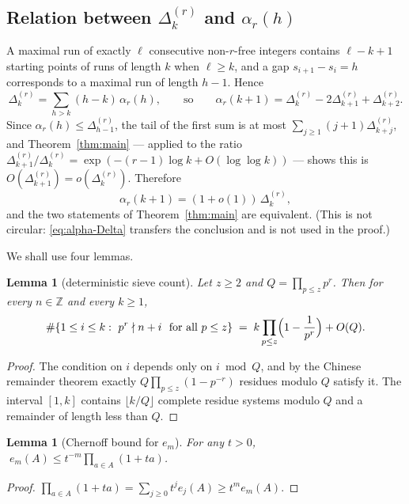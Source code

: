 \documentclass[10pt,a4paper]{amsart}
\newtheorem{lemma}[theorem]{Lemma}
\numberwithin{equation}{section}
\newcommand{\Z}{\mathbb{Z}}
\begin{document}
\subsection*{Relation between $\Delta^{(r)}_k$ and $\alpha_r(h)$}
A maximal run of exactly $\ell$ consecutive non-$r$-free integers contains $\ell-k+1$
starting points of runs of length $k$ when $\ell\ge k$, and a gap $s_{i+1}-s_i=h$
corresponds to a maximal run of length $h-1$. Hence
\begin{equation}\label{eq:D-alpha}
  \Delta^{(r)}_k=\sum_{h>k}(h-k)\,\alpha_r(h),\qquad\text{so}\qquad
  \alpha_r(k+1)=\Delta^{(r)}_k-2\Delta^{(r)}_{k+1}+\Delta^{(r)}_{k+2}.
\end{equation}
Since $\alpha_r(h)\le\Delta^{(r)}_{h-1}$, the tail of the first sum is at most
$\sum_{j\ge1}(j+1)\Delta^{(r)}_{k+j}$, and Theorem~\ref{thm:main} --- applied to the ratio
$\Delta^{(r)}_{k+1}/\Delta^{(r)}_k=\exp(-(r-1)\log k+O(\log\log k))$ --- shows this is
$O(\Delta^{(r)}_{k+1})=o(\Delta^{(r)}_k)$. Therefore
\begin{equation}\label{eq:alpha-Delta}
  \alpha_r(k+1)=(1+o(1))\,\Delta^{(r)}_k ,
\end{equation}
and the two statements of Theorem~\ref{thm:main} are equivalent. (This is not circular:
\eqref{eq:alpha-Delta} transfers the conclusion and is not used in the proof.)

We shall use four lemmas.

\begin{lemma}[deterministic sieve count]\label{lem:sieve}
Let $z\ge2$ and $Q=\prod_{p\le z}p^{r}$. Then for every $n\in\Z$ and every $k\ge1$,
\[
  \#\{1\le i\le k:\ p^{r}\nmid n+i\ \text{ for all } p\le z\}
  \;=\;k\prod_{p\le z}\Bigl(1-\frac1{p^{r}}\Bigr)+O(Q).
\]
\end{lemma}

\begin{proof}
The condition on $i$ depends only on $i\bmod Q$, and by the Chinese remainder theorem
exactly $Q\prod_{p\le z}(1-p^{-r})$ residues modulo $Q$ satisfy it. The interval $[1,k]$
contains $\lfloor k/Q\rfloor$ complete residue systems modulo $Q$ and a remainder of length
less than $Q$.
\end{proof}

\begin{lemma}[Chernoff bound for $e_m$]\label{lem:chernoff}
For any $t>0$, $\;e_m(A)\le t^{-m}\prod_{a\in A}(1+ta)$.
\end{lemma}

\begin{proof}
$\prod_{a\in A}(1+ta)=\sum_{j\ge0}t^{j}e_j(A)\ge t^{m}e_m(A)$.
\end{proof}
\end{document}
